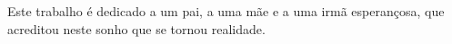 \begin{dedicatoria}
   \vspace*{\fill}
   	\begin{flushright}
   \noindent
    Este trabalho é dedicado a um pai, a uma mãe e a uma irmã esperançosa, que acreditou neste sonho que se tornou realidade.
   	\end{flushright}
\end{dedicatoria}
